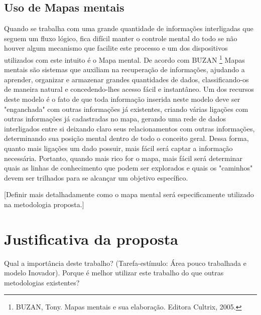 \documentclass[
	12pt,				%
	openright,			%
	twoside,			%
	a4paper,			%
	english,			%
	french,				%
	spanish,			%
	brazil				%
	]{abntex2}
\begin{document}
\subsection{Uso de Mapas mentais}

Quando se trabalha com uma grande quantidade de informações interligadas que seguem um fluxo lógico, fica difícil manter o controle mental do todo se não houver algum mecanismo que facilite este processo e um dos dispositivos utilizados com este intuito é o Mapa mental. De acordo com BUZAN \footnote{BUZAN, Tony. Mapas mentais e sua elaboração. Editora Cultrix, 2005.} Mapas mentais são sistemas que auxiliam na recuperação de informações, ajudando a aprender, organizar e armazenar grandes quantidades de dados, classificando-os de maneira natural e concedendo-lhes acesso fácil e instantâneo. Um dos recursos deste modelo é o fato de que toda informação inserida neste modelo deve ser "enganchada" com outras informações já existentes, criando várias ligações com outras informações já cadastradas no mapa, gerando uma rede de dados interligados entre si deixando claro seus relacionamentos com outras informações, determinando sua posição mental dentro de todo o conceito geral. Dessa forma, quanto mais ligações um dado possuir, mais fácil será captar a informação necessária. Portanto, quando mais rico for o mapa, mais fácil será determinar quais as linhas de conhecimento que podem ser explorados e quais os "caminhos" devem ser trilhados para se alcançar um objetivo específico.

[Definir mais detalhadamente como o mapa mental será especificamente utilizado na metodologia proposta.]

\section{Justificativa da proposta}
Qual a importância deste trabalho? (Tarefa-estímulo: Área pouco trabalhada e modelo Inovador).
Porque é melhor utilizar este trabalho do que outras metodologias existentes?





\end{document}
